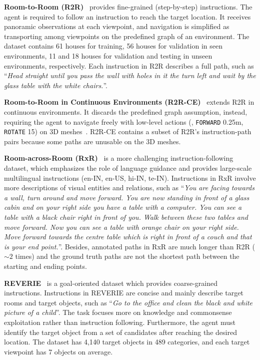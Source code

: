 \vspace{1mm}
\noindent\textbf{Room-to-Room (R2R)}~\cite{anderson2018vision} provides fine-grained (step-by-step) instructions. 
The agent is required to follow an instruction to reach the target location.
It receives panoramic observations at each viewpoint, and navigation is simplified as transporting among viewpoints on the predefined graph of an environment. 
The dataset contains 61 houses for training, 56 houses for validation in seen environments, 11 and 18 houses for validation and testing in unseen environments, respectively. 
Each instruction in R2R describes a full path, such as ``\textit{Head straight until you pass the wall with holes in it the turn left and wait by the glass table with the white chairs.}''.


\vspace{1mm}
\noindent\textbf{Room-to-Room in Continuous Environments (R2R-CE)}~\cite{krantz2020beyond} extends R2R in continuous environments.
It discards the predefined graph assumption, instead, requiring the agent to navigate freely with low-level actions (\eg, \texttt{FORWARD} 0.25m, \texttt{ROTATE} 15\degree) on 3D meshes~\cite{savva2019habitat}. 
R2R-CE contains a subset of R2R's instruction-path pairs because some paths are unusable on the 3D meshes. 


\vspace{1mm}
\noindent\textbf{Room-across-Room (RxR)}~\cite{ku2020room} is a more challenging instruction-following dataset, which emphasizes the role of language guidance and provides large-scale multilingual instructions (en-IN, en-US, hi-IN, te-IN). 
Instructions in RxR involve more descriptions of visual entities and relations, such as ``\textit{You are facing towards a wall, turn around and move forward. You are now standing in front of a glass cabin and on your right side you have a table with a computer. You can see a table with a black chair right in front of you. Walk between these two tables and move forward. Now you can see a table with orange chair on your right side. Move forward towards the centre table which is right in front of a couch and that is your end point.}''.
Besides, annotated paths in RxR are much longer than R2R ($\sim 2$ times) and the ground truth paths are not the shortest path between the starting and ending points.



\vspace{1mm}
\noindent\textbf{REVERIE}~\cite{qi2020reverie} is a goal-oriented dataset which provides coarse-grained instructions. 
Instructions in REVERIE are concise and mainly describe target rooms and target objects, such as ``\textit{Go to the office and clean the black and white picture of a child}''. 
The task focuses more on knowledge and commonsense exploitation rather than instruction following. 
Furthermore, the agent must identify the target object from a set of candidates after reaching the desired location.
The dataset has 4,140 target objects in 489 categories, and each target viewpoint has 7 objects on average. 




